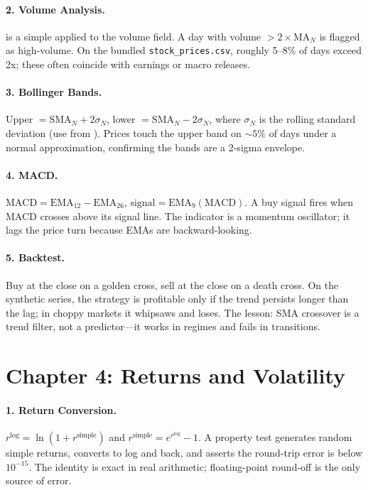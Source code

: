 \paragraph{2. Volume Analysis.}
 is a simple  applied to the volume field.
A day with volume $> 2 \times \text{MA}_N$ is flagged as high-volume.
On the bundled \texttt{stock\_prices.csv}, roughly 5--8\% of days
exceed 2x; these often coincide with earnings or macro releases.

\paragraph{3. Bollinger Bands.}
Upper $= \text{SMA}_N + 2 \sigma_N$, lower $= \text{SMA}_N - 2
\sigma_N$, where $\sigma_N$ is the rolling standard deviation (use
 from ). Prices touch the
upper band on $\sim 5\%$ of days under a normal approximation,
confirming the bands are a 2-sigma envelope.

\paragraph{4. MACD.}
$\text{MACD} = \text{EMA}_{12} - \text{EMA}_{26}$,
$\text{signal} = \text{EMA}_9(\text{MACD})$. A buy signal fires when
MACD crosses above its signal line. The indicator is a
momentum oscillator; it lags the price turn because EMAs are
backward-looking.

\paragraph{5. Backtest.}
Buy at the close on a golden cross, sell at the close on a death
cross. On the synthetic series, the strategy is profitable only if
the trend persists longer than the lag; in choppy markets it
whipsaws and loses. The lesson: SMA crossover is a trend filter,
not a predictor---it works in regimes and fails in transitions.

\section*{Chapter 4: Returns and Volatility}

\paragraph{1. Return Conversion.}
$r^{\text{log}} = \ln(1 + r^{\text{simple}})$ and
$r^{\text{simple}} = e^{r^{\text{log}}} - 1$. A property test
generates random simple returns, converts to log and back, and
asserts the round-trip error is below $10^{-15}$. The identity is
exact in real arithmetic; floating-point round-off is the only
source of error.

